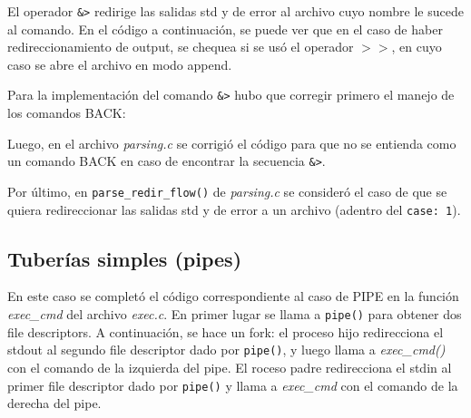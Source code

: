 \documentclass{article}
\begin{document}
El operador \texttt{\&\textgreater} redirige las salidas std y de error al archivo cuyo nombre le sucede al comando.
En el código a continuación, se puede ver que en el caso de haber redireccionamiento de output, se chequea si se usó el operador \texttt{$>>$}, en cuyo caso se abre el archivo en modo append.

Para la implementación del comando \texttt{\&\textgreater} hubo que corregir primero el manejo de los comandos BACK:

Luego, en el archivo \textit{parsing.c} se corrigió el código para que no se entienda como un comando BACK en caso de encontrar la secuencia \texttt{\&\textgreater}. 

Por último, en \texttt{parse\_redir\_flow()} de \textit{parsing.c} se consideró el caso de que se quiera redireccionar las salidas std y de error a un archivo (adentro del \texttt{case: 1}).


\subsection{Tuberías simples (pipes)}
En este caso se completó el código correspondiente al caso de PIPE en la función \textit{exec\_cmd} del archivo \textit{exec.c}. En primer lugar se llama a \texttt{pipe()} para obtener dos file descriptors. A continuación, se hace un fork: el proceso hijo redirecciona el stdout al segundo file descriptor dado por \texttt{pipe()}, y luego llama a \textit{exec\_cmd()} con el comando de la izquierda del pipe. El roceso padre redirecciona el stdin al primer file descriptor dado por \texttt{pipe()} y llama a \textit{exec\_cmd} con el comando de la derecha del pipe.

\end{document}
